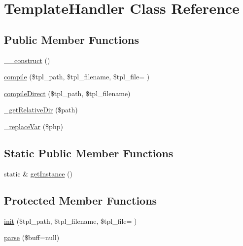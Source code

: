 \hypertarget{classTemplateHandler}{}\section{Template\+Handler Class Reference}
\label{classTemplateHandler}
\subsection*{Public Member Functions}
\begin{DoxyCompactItemize}
\item 
\hyperlink{classTemplateHandler_ab113c65769e65c4fe531c4cf41655f1d}{\+\_\+\+\_\+construct} ()
\item 
\hyperlink{classTemplateHandler_ae2e69591d815bb49316bb85adbaff581}{compile} (\$tpl\+\_\+path, \$tpl\+\_\+filename, \$tpl\+\_\+file= \textquotesingle{}\textquotesingle{})
\item 
\hyperlink{classTemplateHandler_a1fe9c84873c23970ea7779be59dcb2d5}{compile\+Direct} (\$tpl\+\_\+path, \$tpl\+\_\+filename)
\item 
\hyperlink{classTemplateHandler_a6d8e3da7128be8bded89dc9edc4a1bc8}{\+\_\+get\+Relative\+Dir} (\$path)
\item 
\hyperlink{classTemplateHandler_a10cb255c35e1e617f182e349b80cc335}{\+\_\+replace\+Var} (\$php)
\end{DoxyCompactItemize}
\subsection*{Static Public Member Functions}
\begin{DoxyCompactItemize}
\item 
static \& \hyperlink{classTemplateHandler_a9745460c5daccfc48abf8652778b2718}{get\+Instance} ()
\end{DoxyCompactItemize}
\subsection*{Protected Member Functions}
\begin{DoxyCompactItemize}
\item 
\hyperlink{classTemplateHandler_a783df180d319abe3722862ed6edacb9d}{init} (\$tpl\+\_\+path, \$tpl\+\_\+filename, \$tpl\+\_\+file= \textquotesingle{}\textquotesingle{})
\item 
\hyperlink{classTemplateHandler_acf0023ac6383d43e9b0ab854c75c0694}{parse} (\$buff=null)
\end{DoxyCompactItemize}



